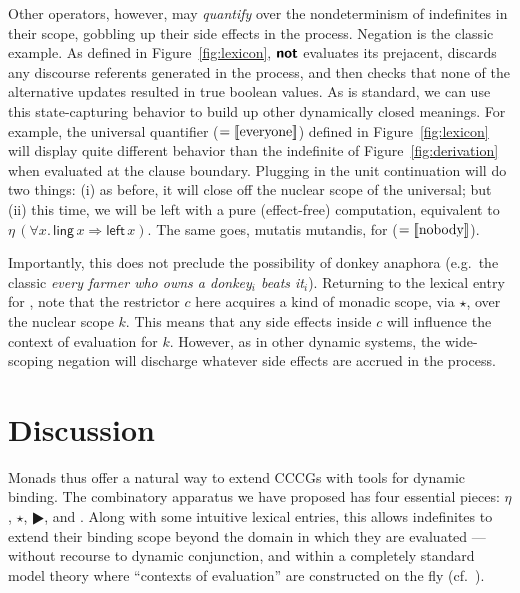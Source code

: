   Other operators, however, may \emph{quantify} over the nondeterminism of indefinites in their scope, gobbling up their side effects in the process. Negation is the classic example. As defined in Figure~\ref{fig:lexicon}, $\textbf{\textsf{not}}$ evaluates its prejacent, discards any discourse referents generated in the process, and then checks that none of the alternative updates resulted in true boolean values. As is standard, we can use this state-capturing behavior to build up other dynamically closed meanings. For example, the universal quantifier  ($=\sv{\text{everyone}}$) defined in Figure~\ref{fig:lexicon} will display quite different behavior than the indefinite of Figure~\ref{fig:derivation} when evaluated at the clause boundary. Plugging in the unit continuation will do two things: (i) as before, it will close off the nuclear scope of the universal; but (ii) this time, we will be left with a pure (effect-free) computation, equivalent to $\eta\,(\forall x.\,\textsf{ling}\,x \Rightarrow \textsf{left}\,x)$. The same goes, mutatis mutandis, for  ($= \sv{\text{nobody}}$).%

  Importantly, this does not preclude the possibility of donkey anaphora (e.g.~the classic \emph{every farmer who owns a donkey$_i$ beats it$_i$}). Returning to the lexical entry for , note that the restrictor $c$ here acquires a kind of monadic scope, via $\star$, over the nuclear scope $k$. This means that any side effects inside $c$ will influence the context of evaluation for $k$. However, as in other dynamic systems, the wide-scoping negation will discharge whatever side effects are accrued in the process. %

\section{Discussion}
	Monads thus offer a natural way to extend CCCGs with tools for dynamic binding. The combinatory apparatus we have proposed has four essential pieces: $\eta$, $\star$, $\RHD$, and . Along with some intuitive lexical entries, this allows indefinites to extend their binding scope beyond the domain in which they are evaluated --- without recourse to dynamic conjunction, and within a completely standard model theory where ``contexts of evaluation'' are constructed on the fly (cf.~\citealt{Eijck:2001, Groote:2006}).%

	
